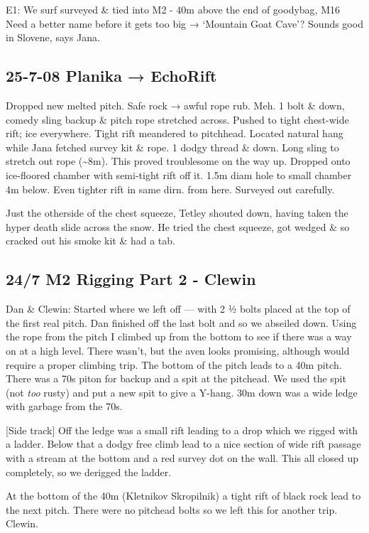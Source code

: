 E1: We surf surveyed \& tied into M2 - 40m above the end of goodybag,
M16 Need a better name before it gets too big → `Mountain Goat Cave'?
Sounds good in Slovene, says Jana.

\subsection{25-7-08 Planika → EchoRift}\label{planika-echorift}

Dropped new melted pitch. Safe rock → awful rope rub. Meh. 1 bolt \&
down, comedy sling backup \& pitch rope stretched across. Pushed to
tight chest-wide rift; ice everywhere. Tight rift meandered to
pitchhead. Located natural hang while Jana fetched survey kit \& rope. 1
dodgy thread \& down. Long sling to stretch out rope
(\textasciitilde{}8m). This proved troublesome on the way up. Dropped
onto ice-floored chamber with semi-tight rift off it. 1.5m diam hole to
small chamber 4m below. Even tighter rift in same dirn. from here.
Surveyed out carefully.

Just the otherside of the chest squeeze, Tetley shouted down, having
taken the hyper death slide across the snow. He tried the chest squeeze,
got wedged \& so cracked out his smoke kit \& had a tab.

\subsection{24/7 M2 Rigging Part 2 -
Clewin}\label{m2-rigging-part-2---clewin}

Dan \& Clewin: Started where we left off --- with 2 ½ bolts placed at
the top of the first real pitch. Dan finished off the last bolt and so
we abseiled down. Using the rope from the pitch I climbed up from the
bottom to see if there was a way on at a high level. There wasn't, but
the aven looks promising, although would require a proper climbing trip.
The bottom of the pitch leads to a 40m pitch. There was a 70s piton for
backup and a spit at the pitchead. We used the spit (not \emph{too}
rusty) and put a new spit to give a Y-hang. 30m down was a wide ledge
with garbage from the 70s.

{[}Side track{]} Off the ledge was a small rift leading to a drop which
we rigged with a ladder. Below that a dodgy free climb lead to a nice
section of wide rift passage with a stream at the bottom and a red
survey dot on the wall. This all closed up completely, so we derigged
the ladder.

At the bottom of the 40m (Kletnikov Skropilnik) a tight rift of black
rock lead to the next pitch. There were no pitchead bolts so we left
this for another trip. Clewin.

